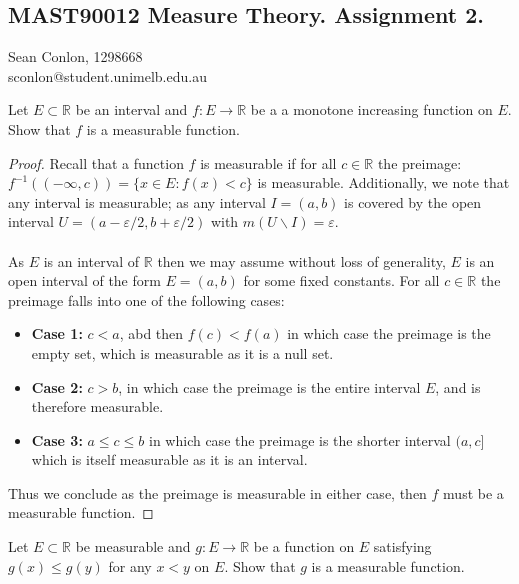 \documentclass[nocolor]{report}
\begin{document}
    \newpage
    \subsection*{MAST90012 Measure Theory. Assignment 2.}
\begin{center}
    Sean Conlon, 1298668 \\
    sconlon@student.unimelb.edu.au
\end{center}


\begin{ex}[Question 1a.] Let $E\subset\mathbb{R}$ be an interval and $f: E\rightarrow\mathbb{R}$ be a a monotone increasing function on $E$. Show that $f$ is a measurable function. 
\end{ex}
\begin{proof}
    Recall that a function $f$ is measurable if for all $c\in\mathbb{R}$ the preimage: $f^{-1}((-\infty, c)) = \{x\in E: f(x) < c \}$ is measurable. Additionally, we note that any interval is measurable; as any interval $I = (a,b)$ is covered by the open interval $U = (a-\varepsilon/2, b+\varepsilon/2)$ with $m(U\backslash I) = \varepsilon$. \\
    \\
    As $E$ is an interval of $\mathbb{R}$ then we may assume without loss of generality, $E$ is an open interval of the form $E = (a,b)$ for some fixed constants. For all $c\in\mathbb{R}$ the preimage falls into one of the following cases:\begin{itemize}
        \item \textbf{Case 1:} $c < a$, abd then $f(c) < f(a)$ in which case the preimage is the empty set, which is measurable as it is a null set. 
        \item \textbf{Case 2:} $c > b$, in which case the preimage is the entire interval $E$, and is therefore measurable. 
        \item \textbf{Case 3:} $a \leq c \leq b$ in which case the preimage is the shorter interval $(a, c]$ which is itself measurable as it is an interval. 
    \end{itemize}
    Thus we conclude as the preimage is measurable in either case, then $f$ must be a measurable function.
\end{proof}
\begin{ex}[Question 1b.] Let $E\subset\mathbb{R}$ be measurable and $g: E\rightarrow\mathbb{R}$ be a function on $E$ satisfying $g(x)\leq g(y)$ for any $x<y$ on $E$. Show that $g$ is a measurable function. 
\end{ex}
\end{document}
